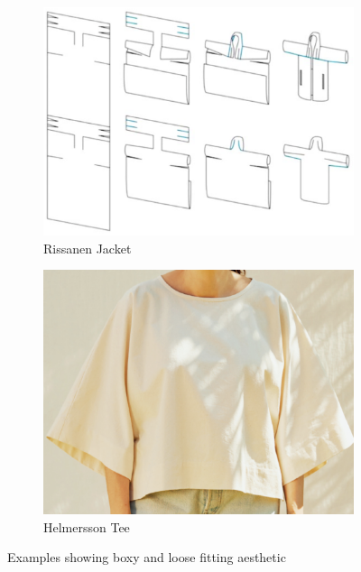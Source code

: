 \begin{figure} [H]
    \centering
    \begin{subfigure}[a]{0.6\textwidth}
        \centering
        \includegraphics[width=\textwidth]{Images/rissanen jacket.png}
        \caption{Rissanen Jacket}
    \end{subfigure}
    \hfill
    \begin{subfigure}[b]{0.3\textwidth}
        \centering
        \includegraphics[width=\textwidth]{Images/bh tee.png}
        \caption{Helmersson Tee}
    \end{subfigure}
    \caption{Examples showing boxy and loose fitting aesthetic}
\end{figure}

